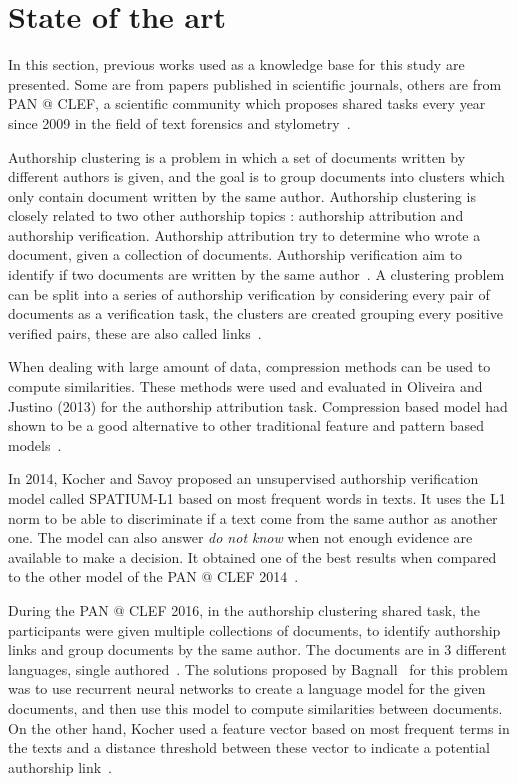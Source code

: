 \section{State of the art \label{sec:state_of_the_art}}

In this section, previous works used as a knowledge base for this study are presented.
Some are from papers published in scientific journals, others are from PAN @ CLEF, a scientific community which proposes shared tasks every year since 2009 in the field of text forensics and stylometry~\cite{pan_webis}.

Authorship clustering is a problem in which a set of documents written by different authors is given, and the goal is to group documents into clusters which only contain document written by the same author.
Authorship clustering is closely related to two other authorship topics : authorship attribution and authorship verification.
Authorship attribution try to determine who wrote a document, given a collection of documents.
Authorship verification aim to identify if two documents are written by the same author~\cite{pan11_verif}.
A clustering problem can be split into a series of authorship verification by considering every pair of documents as a verification task, the clusters are created grouping every positive verified pairs, these are also called links~\cite{pan16_clustering_site}.

When dealing with large amount of data, compression methods can be used to compute similarities.
These methods were used and evaluated in Oliveira and Justino (2013) for the authorship attribution task.
Compression based model had shown to be a good alternative to other traditional feature and pattern based models~\cite{comparing_compression}.

In 2014, Kocher and Savoy proposed an unsupervised authorship verification model called \textsc{SPATIUM-L1} based on most frequent words in texts.
It uses the L1 norm to be able to discriminate if a text come from the same author as another one.
The model can also answer \textit{do not know} when not enough evidence are available to make a decision.
It obtained one of the best results when compared to the other model of the PAN @ CLEF 2014~\cite{kocher_linking}.

During the PAN @ CLEF 2016, in the authorship clustering shared task, the participants were given multiple collections of documents, to identify authorship links and group documents by the same author.
The documents are in 3 different languages, single authored~\cite{pan16}.
The solutions proposed by Bagnall~\cite{bagnall_pan16} for this problem was to use recurrent neural networks to create a language model for the given documents, and then use this model to compute similarities between documents.
On the other hand, Kocher used a feature vector based on most frequent terms in the texts and a distance threshold between these vector to indicate a potential authorship link~\cite{kocher_pan16}.

